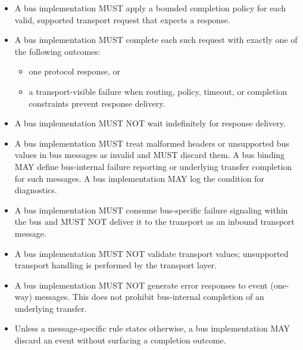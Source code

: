 \begin{itemize}
  \item A bus implementation MUST apply a bounded completion policy for each
        valid, supported transport request that expects a response.
  \item A bus implementation MUST complete each such request with exactly one
        of the following outcomes:
    \begin{itemize}
      \item one protocol response, or
      \item a transport-visible failure when routing, policy, timeout, or
            completion constraints prevent response delivery.
    \end{itemize}
  \item A bus implementation MUST NOT wait indefinitely for response delivery.
  \item A bus implementation MUST treat malformed headers or unsupported bus
         values in bus messages as invalid and MUST discard them.
        A bus binding MAY define bus-internal failure reporting or underlying
        transfer completion for such messages. A bus implementation MAY log
        the condition for diagnostics.
  \item A bus implementation MUST consume bus-specific failure signaling
        within the bus and MUST NOT deliver it to the transport as an inbound
        transport message.
  \item A bus implementation MUST NOT validate transport  values;
        unsupported transport  handling is performed by the
        transport layer.
  \item A bus implementation MUST NOT generate error responses to event
        (one-way) messages. This does not prohibit bus-internal completion of
        an underlying transfer.
  \item Unless a message-specific rule states otherwise, a bus implementation
        MAY discard an event without surfacing a completion outcome.
\end{itemize}

